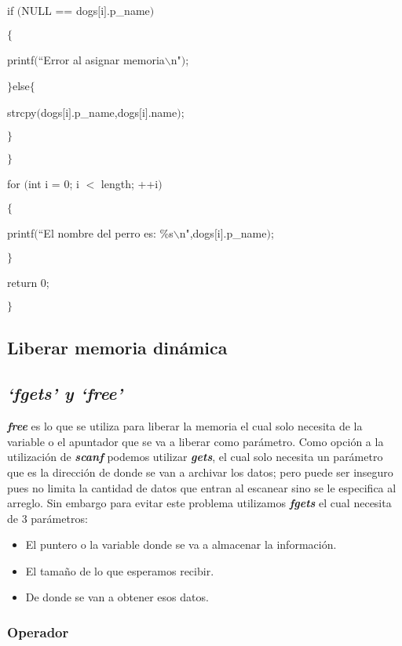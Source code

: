 \documentclass[]{article}
\begin{document}
	if $($NULL == dogs$[$i$]$.p\_name$)$
	
	$\lbrace$
	
	printf$($``Error al asignar memoria$\backslash$n"$)$;
	
	$\rbrace$else$\lbrace$
	
	strcpy$($dogs$[$i$]$.p\_name,dogs$[$i$]$.name$)$;
	
	$\rbrace$
	
	$\rbrace$
	
	for $($int i = 0; i $<$ length; ++i$)$
	
	$\lbrace$
	
	printf$($``El nombre del perro es: \%s$\backslash$n",dogs$[$i$]$.p\_name$)$;
	
	$\rbrace$
	
	return 0;
	
	$\rbrace$
	
	\subsection{Liberar memoria dinámica}
	
	\subsection{\textit{`fgets' y `free'}}
	
	\textit{\textbf{free}} es lo que se utiliza para liberar la memoria el cual solo necesita de la variable o el apuntador que se va a liberar como parámetro. Como opción a la utilización de \textit{\textbf{scanf}} podemos utilizar \textit{\textbf{gets}}, el cual solo necesita un parámetro que es la dirección de donde se van a archivar los datos; pero puede ser inseguro pues no limita la cantidad de datos que entran al escanear sino se le especifica al arreglo. Sin embargo para evitar este problema utilizamos \textit{\textbf{fgets}} el cual necesita de 3 parámetros:\\
	
	\begin{itemize}
		\item El puntero o la variable donde se va a almacenar la información.
		\item El tamaño de lo que esperamos recibir.
		\item De donde se van a obtener esos datos.
	\end{itemize}
	
	
	
	\subsubsection{Operador}
	
\end{document}
